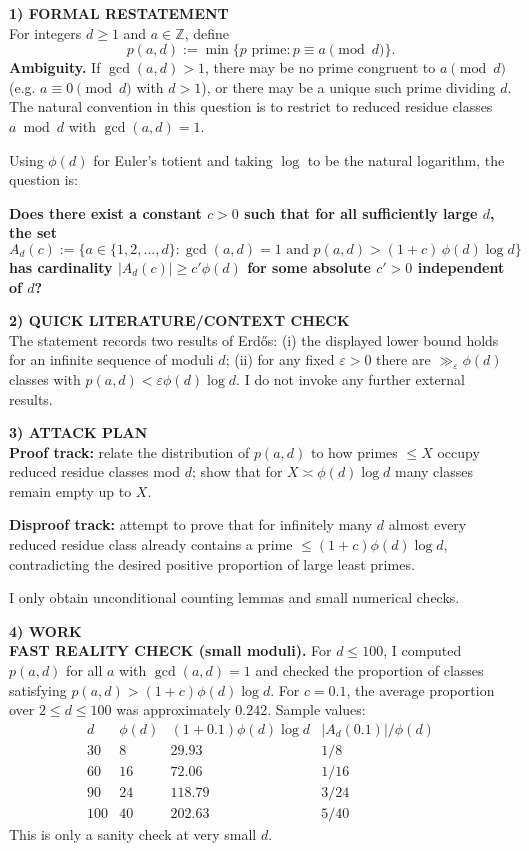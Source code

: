 \medskip
\noindent\textbf{1) FORMAL RESTATEMENT}\\
For integers $d\ge 1$ and $a\in\mathbb{Z}$, define
\[
 p(a,d):=\min\{p\text{ prime}: p\equiv a\pmod d\}.
\]
\textbf{Ambiguity.} If $\gcd(a,d)>1$, there may be no prime congruent to $a\pmod d$ (e.g. $a\equiv 0\pmod d$ with $d>1$), or there may be a unique such prime dividing $d$.  The natural convention in this question is to restrict to reduced residue classes $a\bmod d$ with $\gcd(a,d)=1$.

Using $\phi(d)$ for Euler's totient and taking $\log$ to be the natural logarithm, the question is:

\textbf{Does there exist a constant $c>0$ such that for all sufficiently large $d$, the set}
\[
 A_d(c):=\{a\in\{1,2,\dots,d\}: \gcd(a,d)=1\text{ and }p(a,d)>(1+c)\,\phi(d)\log d\}
\]
\textbf{has cardinality $|A_d(c)|\ge c'\phi(d)$ for some absolute $c'>0$ independent of $d$?}

\medskip
\noindent\textbf{2) QUICK LITERATURE/CONTEXT CHECK}\\
The statement records two results of Erd\H{o}s: (i) the displayed lower bound holds for an infinite sequence of moduli $d$; (ii) for any fixed $\varepsilon>0$ there are $\gg_\varepsilon \phi(d)$ classes with $p(a,d)<\varepsilon\phi(d)\log d$.  I do not invoke any further external results.

\medskip
\noindent\textbf{3) ATTACK PLAN}\\
\textbf{Proof track:} relate the distribution of $p(a,d)$ to how primes $\le X$ occupy reduced residue classes mod $d$; show that for $X\asymp \phi(d)\log d$ many classes remain empty up to $X$.

\textbf{Disproof track:} attempt to prove that for infinitely many $d$ almost every reduced residue class already contains a prime $\le (1+c)\phi(d)\log d$, contradicting the desired positive proportion of large least primes.

I only obtain unconditional counting lemmas and small numerical checks.

\medskip
\noindent\textbf{4) WORK}\\
\textbf{FAST REALITY CHECK (small moduli).} For $d\le 100$, I computed $p(a,d)$ for all $a$ with $\gcd(a,d)=1$ and checked the proportion of classes satisfying $p(a,d)>(1+c)\phi(d)\log d$.
For $c=0.1$, the average proportion over $2\le d\le 100$ was approximately $0.242$.  Sample values:
\[
\begin{array}{c|c|c|c}
 d & \phi(d) & (1+0.1)\phi(d)\log d & |A_d(0.1)|/\phi(d)\\\hline
 30 & 8 & 29.93 & 1/8\\
 60 & 16 & 72.06 & 1/16\\
 90 & 24 & 118.79 & 3/24\\
 100 & 40 & 202.63 & 5/40
\end{array}
\]
This is only a sanity check at very small $d$.

